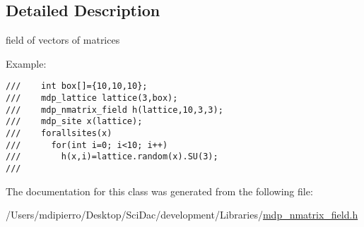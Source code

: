 \subsection{Detailed Description}
field of vectors of matrices 

Example: 

\footnotesize\begin{verbatim}
///    int box[]={10,10,10};
///    mdp_lattice lattice(3,box);
///    mdp_nmatrix_field h(lattice,10,3,3);
///    mdp_site x(lattice);
///    forallsites(x)
///      for(int i=0; i<10; i++)
///        h(x,i)=lattice.random(x).SU(3);
/// \end{verbatim}
\normalsize
 

The documentation for this class was generated from the following file:\begin{CompactItemize}
\item 
/Users/mdipierro/Desktop/SciDac/development/Libraries/\hyperlink{mdp__nmatrix__field_8h}{mdp\_\-nmatrix\_\-field.h}\end{CompactItemize}
